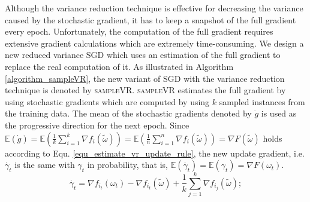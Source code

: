 \documentclass[letterpaper]{article}
\begin{document}
Although  the variance reduction technique is effective for decreasing the variance caused by the stochastic gradient, it has to keep a snapshot of the full gradient  every epoch. Unfortunately, the computation of the full gradient requires extensive gradient calculations which  are extremely time-consuming.  We design a new reduced variance SGD which uses an estimation of the full gradient to replace the real computation of it.  As illustrated in Algorithm \ref{algorithm_sampleVR}, the new variant of SGD with the variance reduction technique is denoted by \textsc{sampleVR}.  \textsc{sampleVR} estimates the full gradient by using  stochastic gradients which are computed by using $k$ sampled  instances  from the training data.  The mean of the stochastic gradients denoted by $\dot{g}$ is used as the progressive direction for the next epoch. Since  $\mathbb{E}(\dot{g}) = \mathbb{E} \left(  \frac{1}{k}\sum\limits_{i=1}^k\nabla f_i(\tilde{\omega}) \right)=  \mathbb{E} \left (\frac{1}{n}\sum\limits_{i=1}^n\nabla f_i(\tilde{\omega}) \right)  =  \nabla F(\tilde{\omega})$ holds according to Equ. \ref{equ_estimate_vr_update_rule}, the new update gradient, i.e. $\dot{\gamma_t}$ is the same with $\gamma_t$ in probability, that is, $\mathbb{E} (  \dot{\gamma_t}) = \mathbb{E} (\gamma_t) = \nabla F(\omega_{t})$. 
\begin{equation}
\label{equ_estimate_vr_update_rule}
\dot{\gamma_t}=\nabla f_{i_t}(\omega_{t})-\nabla f_{i_t}(\tilde{\omega})+\frac{1}{k}\sum\limits_{j=1}^k\nabla f_{i_j}(\tilde{\omega});
\end{equation}
\end{document}
